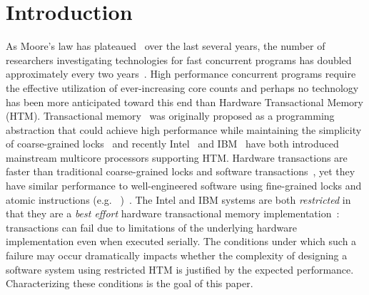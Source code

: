 \section{Introduction}


As Moore's law has plateaued~\cite{Vardi14} over the
last several years, the number of researchers investigating 
technologies for fast concurrent programs has doubled 
approximately every two years~\cite{ACM}. 
High performance concurrent programs require the effective utilization of 
ever-increasing core counts and perhaps no technology
has been more anticipated toward this end than Hardware 
Transactional Memory (HTM).  
Transactional memory~\cite{HerlihyMo93} was originally
proposed as a programming abstraction that could achieve
high performance while maintaining the simplicity of 
coarse-grained locks~\cite{YooHuLa13} and recently 
Intel~\cite{Reinders12,IntelISAX12} and
IBM~\cite{CainMiFr13,Merritt11,IBMPower8Overview14} have both
introduced mainstream multicore processors 
supporting  HTM.  
Hardware transactions are faster than traditional
coarse-grained locks and software
transactions~\cite{YooHuLa13,CascavalBlMi08}, 
yet they have similar
performance to well-engineered software using fine-grained 
locks and atomic instructions (e.g.
~\cite{Herlihy91})~\cite{YooHuLa13}. 
The Intel and IBM
systems are both \emph{restricted} in that they are 
a \emph{best effort} hardware transactional memory
implementation~\cite{Roman12,IntelISAX12,CainMiFr13,IBMPower8Optimization14}:
transactions can fail due to limitations
of the underlying hardware implementation even when 
executed serially.  The conditions
under which such a failure may occur dramatically impacts
whether the complexity of designing a software 
system using restricted HTM
is justified by the expected performance.  Characterizing
these conditions is the goal of this paper. 

